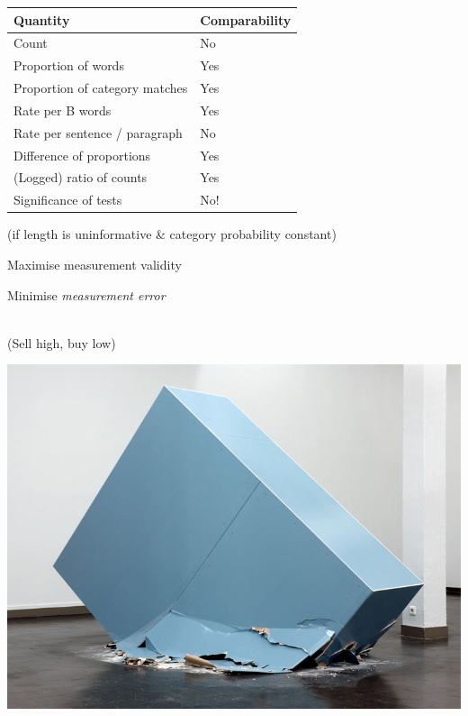 \documentclass[11pt,compress,professionalfonts]{beamer}
\begin{document}
{\small
\begin{center}
\begin{tabular}{ll} \toprule
Quantity & Comparability\\ \midrule
Count & No \\
Proportion of words & Yes\\
Proportion of category matches & Yes\\
Rate per B words & Yes\\ 
Rate per sentence / paragraph & No\\
Difference of proportions & Yes\\
(Logged) ratio of counts & Yes\\ 
Significance of tests & No!\\
\bottomrule
\end{tabular}
\end{center}
\normalsize}

(if length is uninformative \& category probability constant)



Maximise measurement validity

Minimise \textsl{measurement error}

~\\
(Sell high, buy low)
\newpage
\centerline{\includegraphics[scale=.7]{pictures/wickeroth-strategie-der-steine-3-2007}}

\end{document}
